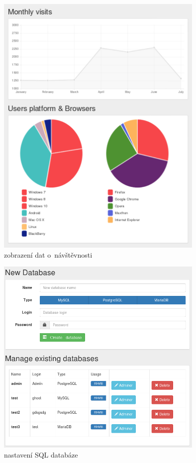 \documentclass[11pt,a4paper]{article}
\begin{document}
      \begin{figure}[ht]
        \begin{center}
          \includegraphics[width=10cm]{graphs}
          \caption{zobrazení dat o~návštěvnosti}
          \label{statistiky}
        \end{center}
      \end{figure}

      \begin{figure}[ht]
        \begin{center}
          \includegraphics[width=10cm]{sql}
          \caption{nastavení SQL databáze}
        \end{center}
      \end{figure}
\end{document}
